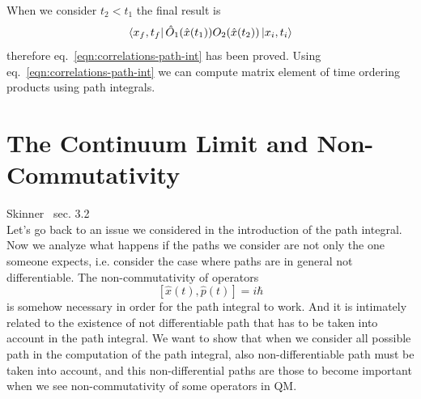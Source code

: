 \documentclass[../main/main.tex]{subfiles}
\begin{document}
%
\noindent When we consider $t_2<t_1$ the final result is
\[\bra{x_f,t_f}\hat O_1(\hat x(t_1)) O_2(\hat x(t_2))\ket{x_i,t_i}\]
therefore eq.~\eqref{eqn:correlations-path-int} has been proved. Using eq.~\eqref{eqn:correlations-path-int} we can compute matrix element of time ordering products using path integrals. 

\section{The Continuum Limit and Non-Commutativity}
\textsf{Skinner~\cite{Skinner:2018aa} sec. 3.2}\\

Let's go back to an issue we considered in the introduction of the path integral. Now we analyze what happens if the paths we consider are not only the one someone expects, i.e. consider the case where paths are in general not differentiable. The non-commutativity of operators
\begin{equation}\label{eqn:non-comm-PI}
[\hat x(t),\hat p(t)]=i\hbar
\end{equation}
is somehow necessary in order for the path integral to work.  And it is intimately related to the existence of not differentiable path that has to be taken into account in the path integral. We want to show that when we consider all possible path in the computation of the path integral, also non-differentiable path must be taken into account, and this non-differential paths are those to become important when we see non-commutativity of some operators in QM. 
\end{document}
